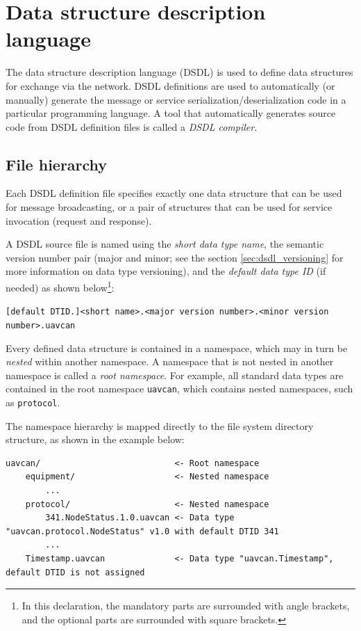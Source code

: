 \chapter{Data structure description language}\label{sec:dsdl}

The data structure description language (DSDL) is used to define data structures for exchange via the network.
DSDL definitions are used to automatically (or manually) generate the message or service
serialization/deserialization code in a particular programming language.
A tool that automatically generates source code from DSDL definition files is called a \emph{DSDL compiler}.

\section{File hierarchy}

Each DSDL definition file specifies exactly one data structure that can be used for message broadcasting,
or a pair of structures that can be used for service invocation (request and response).

A DSDL source file is named using the \emph{short data type name},
the semantic version number pair (major and minor; see the section \ref{sec:dsdl_versioning}
for more information on data type versioning),
and the \emph{default data type ID} (if needed) as shown
below\footnote{In this declaration, the mandatory parts are surrounded with angle brackets,
and the optional parts are surrounded with square brackets.}:

\verb|[default DTID.]<short name>.<major version number>.<minor version number>.uavcan|

Every defined data structure is contained in a namespace,
which may in turn be \emph{nested} within another namespace.
A namespace that is not nested in another namespace is called a \emph{root namespace}.
For example, all standard data types are contained in the root namespace \verb|uavcan|,
which contains nested namespaces, such as \verb|protocol|.

The namespace hierarchy is mapped directly to the file system directory structure,
as shown in the example below:

\begin{verbatim}
uavcan/                           <- Root namespace
    equipment/                    <- Nested namespace
        ...
    protocol/                     <- Nested namespace
        341.NodeStatus.1.0.uavcan <- Data type "uavcan.protocol.NodeStatus" v1.0 with default DTID 341
        ...
    Timestamp.uavcan              <- Data type "uavcan.Timestamp", default DTID is not assigned
\end{verbatim}

